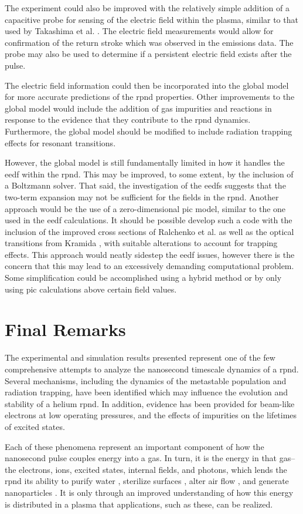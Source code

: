 The experiment could also be improved with the relatively simple addition of a
capacitive probe for sensing of the electric field within the plasma, similar to
that used by Takashima et al. \cite{Takashima2011}. The electric field
measurements would allow for confirmation of the return stroke which was
observed in the emissions data. The probe may also be used to determine if a
persistent electric field exists after the pulse.

The electric field information could then be incorporated into the global model
for more accurate predictions of the \acs{rpnd} properties. Other improvements
to the global model would include the addition of gas impurities and reactions
in response to the evidence that they contribute to the \acs{rpnd} dynamics.
Furthermore, the global model should be modified to include radiation trapping
effects for resonant transitions.

However, the global model is still fundamentally limited in how it handles the
\acs{eedf} within the \acs{rpnd}. This may be improved, to some extent, by the
inclusion of a Boltzmann solver. That said, the investigation of the \acs{eedf}s
suggests that the two-term expansion may not be sufficient for the fields in the
\acs{rpnd}. Another approach would be the use of a zero-dimensional \acs{pic}
model, similar to the one used in the \acs{eedf} calculations. It should be
possible develop such a code with the inclusion of the improved cross sections
of Ralchenko et al. \cite{Ralchenko2008} as well as the optical transitions from
Kramida \cite{Kramida2012}, with suitable alterations to account for trapping
effects. This approach would neatly sidestep the \acs{eedf} issues, however
there is the concern that this may lead to an excessively demanding
computational problem. Some simplification could be accomplished using a hybrid
method or by only using \acs{pic} calculations above certain field values.

\section{Final Remarks}

The experimental and simulation results presented represent one of the few
comprehensive attempts to analyze the nanosecond timescale dynamics of a
\acs{rpnd}. Several mechanisms, including the dynamics of the metastable
population and radiation trapping, have been identified which may influence the
evolution and stability of a helium \acs{rpnd}. In addition, evidence has been
provided for beam-like electrons at low operating pressures, and the effects of
impurities on the lifetimes of excited states.

Each of these phenomena represent an important component of how the nanosecond
pulse couples energy into a gas. In turn, it is the energy in that gas--the
electrons, ions, excited states, internal fields, and photons, which lends the
\acs{rpnd} its ability to purify water \cite{Malik2001}, sterilize surfaces
\cite{Ayan2009}, alter air flow \cite{Nishihara2007}, and generate nanoparticles
\cite{Ostrikov2011}. It is only through an improved understanding of how this
energy is distributed in a plasma that applications, such as these, can be
realized.
